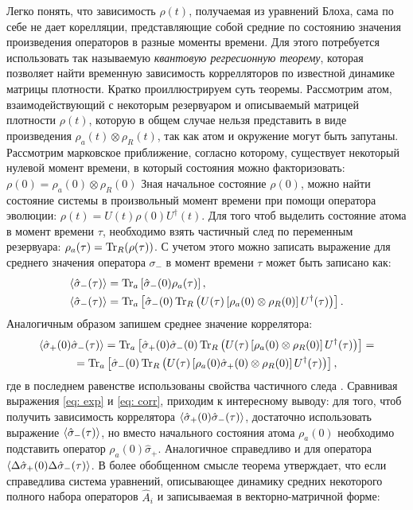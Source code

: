 Легко понять, что зависимость $\rho(t)$, получаемая из уравнений Блоха, сама по себе не дает корелляции, представляющие собой средние по состоянию значения произведения операторов в разные моменты времени. Для этого потребуется использовать так называемую \textit{квантовую регресионную теорему}, которая позволяет найти временную зависимость коррелляторов по известной динамике матрицы плотности. Кратко проиллюстрируем суть теоремы. Рассмотрим атом, взаимодействующий с некоторым резервуаром и описываемый матрицей плотности $\rho(t)$, которую в общем случае нельзя представить в виде произведения $\rho_a(t)\otimes\rho_R(t)$, так как атом и окружение могут быть запутаны. Рассмотрим марковское приближение, согласно которому, существует некоторый нулевой момент времени, в который состояния можно факторизовать: $\rho(0)=\rho_a(0)\otimes\rho_R(0)$ Зная начальное состояние $\rho(0)$, можно найти состояние системы в произвольный момент времени при помощи оператора эволюции: $\rho(t)=U(t)\rho(0)U^\dagger(t)$. Для того чтоб выделить состояние атома в момент времени $\tau$, необходимо взять частичный след по переменным резервуара: $\rho_a(\tau) = \operatorname{Tr}_R(\rho(\tau))$. С учетом этого можно записать выражение для среднего значения оператора $\sigma_-$ в момент времени $\tau$ может быть записано как:
\begin{align}
\braket{\hat{\sigma}_-(\tau)} &=  \operatorname{Tr}_a\left[\hat{\sigma}_-(0)\rho_a(\tau)\right],\\ \braket{\hat{\sigma}_-(\tau)} &=\operatorname{Tr}_a\left[\hat{\sigma}_-(0)\operatorname{Tr}_R\left(U(\tau)\left[\rho_a(0)\otimes\rho_R(0)\right]U^\dagger(\tau)\right)\right].
\label{eq: exp}
\end{align}
Аналогичным образом запишем среднее значение коррелятора:
\begin{multline}
\braket{\hat{\sigma}_+(0)\hat{\sigma}_-(\tau)} =\operatorname{Tr}_a\left[\hat{\sigma}_+(0)\hat{\sigma}_-(0)\operatorname{Tr}_R\left(U(\tau)\left[\rho_a(0)\otimes\rho_R(0)\right]U^\dagger(\tau)\right)\right]=\\=\operatorname{Tr}_a\left[\hat{\sigma}_-(0)\operatorname{Tr}_R\left(U(\tau)\left[\rho_a(0)\hat\sigma_+(0)\otimes\rho_R(0)\right]U^\dagger(\tau)\right)\right],
\label{eq: corr}
\end{multline}
где в последнем равенстве использованы свойства частичного следа \cite{nielsen2002quantum}. Сравнивая выражения \eqref{eq: exp} и \eqref{eq: corr}, приходим к интересному выводу: для того, чтоб получить зависимость коррелятора $\braket{\hat{\sigma}_+(0)\hat{\sigma}_-(\tau)}$, достаточно использовать выражение $\braket{\hat{\sigma}_-(\tau)}$, но вместо начального состояния атома $\rho_a(0)$ необходимо подставить оператор $\rho_a(0)\hat{\sigma}_+$. Аналогичное справедливо и для оператора $\braket{\Delta\hat{\sigma}_+(0)\Delta\hat{\sigma}_-(\tau)}$. В более обобщенном смысле теорема утверждает, что если справедлива система уравнений, описывающее динамику средних некоторого полного набора операторов $\hat{A}_i$ и записываемая в векторно-матричной форме:
